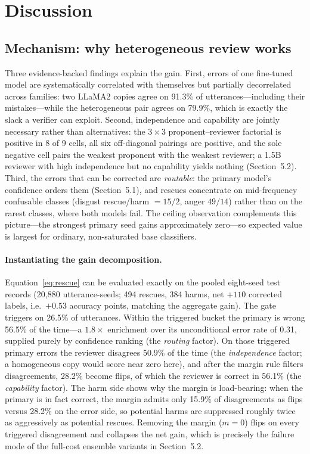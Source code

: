 \documentclass[final,5p,times,twocolumn]{elsarticle}
\begin{document}
\section{Discussion}
\label{sec:discussion}

\subsection{Mechanism: why heterogeneous review works}
\label{sec:mechanism}
Three evidence-backed findings explain the gain. First, errors of one
fine-tuned model are systematically correlated with themselves but partially
decorrelated across families: two LLaMA2 copies agree on 91.3\% of
utterances---including their mistakes---while the heterogeneous pair agrees on
79.9\%, which is exactly the slack a verifier can exploit. Second, independence
and capability are jointly necessary rather than alternatives: the $3\times3$
proponent--reviewer factorial is positive in 8 of 9 cells, all six
off-diagonal pairings are positive, and the sole negative cell pairs the
weakest proponent with the weakest reviewer; a 1.5B reviewer with high
independence but no capability yields nothing (Section~5.2). Third, the errors
that can be corrected are \emph{routable}: the primary model's confidence
orders them (Section~5.1), and rescues concentrate on mid-frequency confusable
classes (disgust rescue/harm $=15/2$, anger $49/14$) rather than on the rarest
classes, where both models fail. The ceiling observation complements this
picture---the strongest primary seed gains approximately zero---so expected
value is largest for ordinary, non-saturated base classifiers.

\paragraph{Instantiating the gain decomposition.}
Equation~\eqref{eq:rescue} can be evaluated exactly on the pooled eight-seed
test records (20{,}880 utterance-seeds; 494 rescues, 384 harms, net $+110$
corrected labels, i.e.\ $+0.53$ accuracy points, matching the aggregate
gain). The gate triggers on 26.5\% of utterances. Within the triggered
bucket the primary is wrong 56.5\% of the time---a $1.8\times$ enrichment
over its unconditional error rate of 0.31, supplied purely by confidence
ranking (the \emph{routing} factor). On those triggered primary errors the
reviewer disagrees 50.9\% of the time (the \emph{independence} factor; a
homogeneous copy would score near zero here), and after the margin rule
filters disagreements, 28.2\% become flips, of which the reviewer is
correct in 56.1\% (the \emph{capability} factor). The harm side shows why
the margin is load-bearing: when the primary is in fact correct, the margin
admits only 15.9\% of disagreements as flips versus 28.2\% on the error
side, so potential harms are suppressed roughly twice as aggressively as
potential rescues. Removing the margin ($m{=}0$) flips on every triggered
disagreement and collapses the net gain, which is precisely the failure
mode of the full-cost ensemble variants in Section~5.2.
\end{document}
